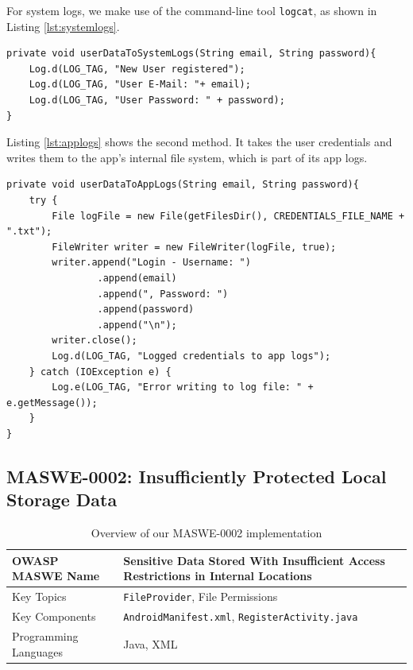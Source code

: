 \noindent
For system logs, we make use of the command-line tool \texttt{logcat}, as shown in Listing \ref{lst:systemlogs}.

\begin{lstlisting}[style=JavaStyle, float=tbh, mathescape=true, captionpos=b, caption=Writing user credentials to system logs using \texttt{logcat}, label=lst:systemlogs]
private void userDataToSystemLogs(String email, String password){
    Log.d(LOG_TAG, "New User registered");
    Log.d(LOG_TAG, "User E-Mail: "+ email);
    Log.d(LOG_TAG, "User Password: " + password);
}
\end{lstlisting}

\noindent
Listing \ref{lst:applogs} shows the second method. It takes the user credentials and writes them to the app's internal file system, which is part of its app logs.

\begin{lstlisting}[style=JavaStyle, float=tbh, mathescape=true, captionpos=b, caption=Writing user credentials to application log files, label=lst:applogs]
private void userDataToAppLogs(String email, String password){
    try {
        File logFile = new File(getFilesDir(), CREDENTIALS_FILE_NAME + ".txt");
        FileWriter writer = new FileWriter(logFile, true);
        writer.append("Login - Username: ")
                .append(email)
                .append(", Password: ")
                .append(password)
                .append("\n");
        writer.close();
        Log.d(LOG_TAG, "Logged credentials to app logs");
    } catch (IOException e) {
        Log.e(LOG_TAG, "Error writing to log file: " + e.getMessage());
    }
}
\end{lstlisting}

\subsection{MASWE-0002: Insufficiently Protected Local Storage Data}

\begin{table}[H]
\centering
\renewcommand{\arraystretch}{1.3}
\begin{tabular}{p{5cm} p{8cm}} 
\toprule
OWASP MASWE Name & Sensitive Data Stored With Insufficient Access Restrictions in Internal Locations \\ 
\midrule
Key Topics & \texttt{FileProvider}, File Permissions \\ 
Key Components & \texttt{AndroidManifest.xml}, \texttt{RegisterActivity.java}\\
Programming Languages & Java, XML \\ 
\bottomrule
\end{tabular}
\caption{Overview of our MASWE-0002 implementation}
\label{tab:maswe-0002}
\end{table}

